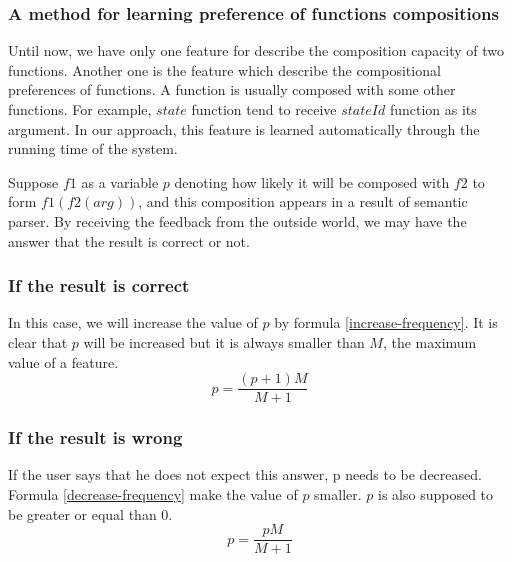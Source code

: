 \subsubsection{A method for learning preference of functions compositions}
Until now, we have only one feature for describe the composition capacity of two functions. Another one is the feature which describe the compositional preferences of functions. A function is usually composed with some other functions. For example, $state$ function tend to receive $stateId$ function as its argument. In our approach, this feature is learned automatically through the running time of the system. 

Suppose $f1$ as a variable $p$ denoting how likely it will be composed with $f2$ to form $f1(f2(arg))$, and this composition appears in a result of semantic parser. By receiving the feedback from the outside world, we may have the answer that the result is correct or not.
\subsubsection*{If the result is correct}
In this case, we will increase the value of $p$ by formula \ref{increase-frequency}. It is clear that $p$ will be increased but it is always smaller than $M$, the maximum value of a feature.
\begin{equation}
\label{increase-frequency}
p = \frac{(p + 1)M}{M+1}
\end{equation}

\subsubsection*{If the result is wrong}
If the user says that he does not expect this answer, p needs to be decreased. Formula \ref{decrease-frequency} make the value of $p$ smaller. $p$ is also supposed to be greater or equal than $0$. 
\begin{equation}
\label{decrease-frequency}
p = \frac{p M}{M+1}
\end{equation}